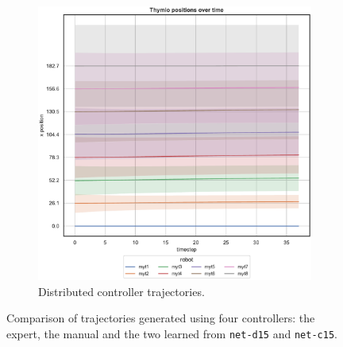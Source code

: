 \begin{figure}[!htb]
\begin{center}
\begin{subfigure}[h]{0.49\textwidth}
			\includegraphics[width=.9\textwidth]{contents/images/net-d15/position-overtime-learned_distributed}
			\caption{Distributed controller trajectories.}
		\end{subfigure}
	\end{center}
	\vspace{-0.5cm}
	\caption[Evaluation of the trajectories learned by \texttt{net-c15}.]{Comparison 
		of trajectories generated using four controllers: the expert, the manual and 
		the two learned from \texttt{net-d15} and \texttt{net-c15}.}	
\end{figure}

